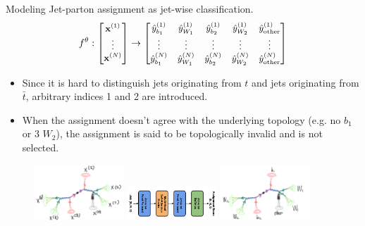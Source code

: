 \documentclass[10pt]{beamer}
\begin{document}
\begin{frame}[fragile]{Modeling}
    Jet-parton assignment as jet-wise classification.\break
    \begin{equation*}
        \small
        f^{\theta}: 
        \begin{bmatrix}
            \mathbf{x}^{(1)} \\
            \vdots \\
            \mathbf{x}^{(N)}
        \end{bmatrix}
        \rightarrow
        \begin{bmatrix}
            \hat{y}^{(1)}_{b_{1}} & \hat{y}^{(1)}_{W_{1}} & \hat{y}^{(1)}_{b_{2}} & \hat{y}^{(1)}_{W_{2}} & \hat{y}^{(1)}_{\textrm{other}} \\
            \vdots & \vdots & \vdots & \vdots & \vdots \\
            \hat{y}^{(N)}_{b_{1}} & \hat{y}^{(N)}_{W_{1}} & \hat{y}^{(N)}_{b_{2}} & \hat{y}^{(N)}_{W_{2}} & \hat{y}^{(N)}_{\textrm{other}}
        \end{bmatrix}
    \end{equation*}
 
    \begin{itemize}
        \item {\footnotesize Since it is hard to distinguish jets originating from $t$ and jets originating from $\bar{t}$, arbitrary indices 1 and 2 are introduced.}
        \item {\footnotesize When the assignment doesn't agree with the underlying topology (e.g. no $b_{1}$ or 3 $ W_{2}$), the assignment is said to be topologically invalid and is not selected.}
    \end{itemize}

    \begin{figure}
        \centering
        \includegraphics[width=0.3\textwidth]{figures/misc/saja-input.jpg}
        \includegraphics[width=0.3\textwidth]{figures/model/model-rot270.pdf}
        \includegraphics[width=0.3\textwidth]{figures/misc/saja-output.jpg}
    \end{figure}


\end{frame}
\end{document}
